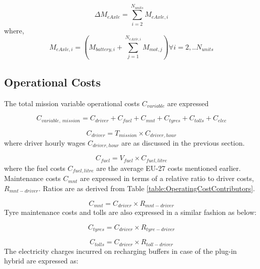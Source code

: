 \documentclass[ExampleMasters.tex]{subfiles}
\begin{document}
			\begin{equation}
				\Delta M_{eAxle} = \displaystyle \sum_{i=2}^{N_{units}} M_{eAxle,i}
			\end{equation}
			where, 
			\begin{equation}
				M_{eAxle,i} = (M_{battery,i} + \sum_{j=1}^{N_{eAxle,i}} M_{mot,j}) \forall i=2,..N_{units}
			\end{equation}

		\subsection{Operational Costs}
			The total mission variable operational costs $C_{variable}$ are expressed
			
			\begin{equation}
				C_{variable,\ mission} = C_{driver} + C_{fuel} + C_{mnt} + C_{tyres} + C_{tolls} + C_{elec}
			\end{equation}

			\begin{equation}
				C_{driver} = T_{mission} \times C_{driver, hour}
			\end{equation}
			where driver hourly wages $C_{driver, hour}$ are as discussed in the previous section.

			\begin{equation}
				C_{fuel} = V_{fuel} \times C_{fuel, litre}
			\end{equation}
			where the fuel costs $C_{fuel, litre}$ are the average EU-27 costs mentioned earlier. Maintenance costs $C_{mnt}$ are expressed in terms of a relative ratio to driver costs, $R_{mnt-driver}$. Ratios are as derived from Table \ref{table:OperatingCostContributors}.

			\begin{equation}
				C_{mnt} = C_{driver} \times R_{mnt-driver}
			\end{equation}
			Tyre maintenance costs and tolls are also expressed in a similar fashion as below:

			\begin{equation}
				C_{tyres} = C_{driver} \times R_{tyre-driver}
			\end{equation}

			\begin{equation}
				C_{tolls} = C_{driver} \times R_{toll-driver}
			\end{equation}
			The electricity charges incurred on recharging buffers in case of the plug-in hybrid are expressed as:
\end{document}
